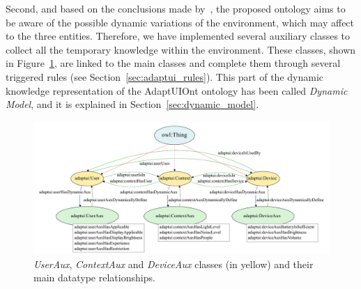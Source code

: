 Second, and based on the conclusions made by~\citet{gregor_designing_2002},
the proposed ontology aims to be aware of the possible dynamic variations of the
environment, which may affect to the three entities. Therefore, we have implemented
several auxiliary classes to collect all the temporary knowledge within the
environment. These classes, shown in Figure~\ref{fig:auxiliary_classes}, are
linked to the main classes and complete them through several triggered rules
(see Section~\ref{sec:adaptui_rules}). This part of the dynamic knowledge
representation of the AdaptUIOnt ontology has been called \textit{Dynamic Model},
and it is explained in Section~\ref{sec:dynamic_model}.


\begin{figure}
\centering
\includegraphics[width=1.0\textwidth]{../figures/PDF/auxiliary_classes.pdf}
\caption{\textit{UserAux}, \textit{ContextAux} and \textit{DeviceAux} classes
(in yellow) and their main datatype relationships.}
\label{fig:auxiliary_classes}
\end{figure}


